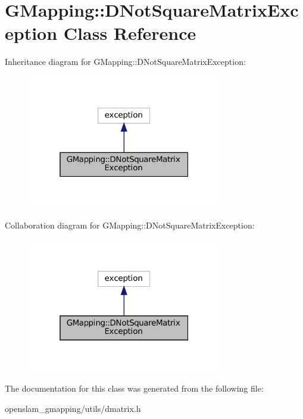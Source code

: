 \hypertarget{classGMapping_1_1DNotSquareMatrixException}{}\section{G\+Mapping\+:\+:D\+Not\+Square\+Matrix\+Exception Class Reference}
\label{classGMapping_1_1DNotSquareMatrixException}


Inheritance diagram for G\+Mapping\+:\+:D\+Not\+Square\+Matrix\+Exception\+:
\nopagebreak
\begin{figure}[H]
\begin{center}
\leavevmode
\includegraphics[width=241pt]{classGMapping_1_1DNotSquareMatrixException__inherit__graph}
\end{center}
\end{figure}


Collaboration diagram for G\+Mapping\+:\+:D\+Not\+Square\+Matrix\+Exception\+:
\nopagebreak
\begin{figure}[H]
\begin{center}
\leavevmode
\includegraphics[width=241pt]{classGMapping_1_1DNotSquareMatrixException__coll__graph}
\end{center}
\end{figure}


The documentation for this class was generated from the following file\+:\begin{DoxyCompactItemize}
\item 
openslam\+\_\+gmapping/utils/dmatrix.\+h\end{DoxyCompactItemize}
